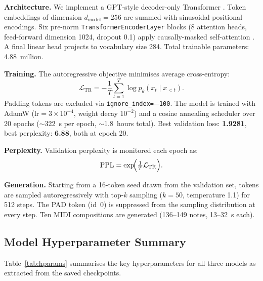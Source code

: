\documentclass[conference]{IEEEtran}
\begin{document}
\textbf{Architecture.} We implement a GPT-style decoder-only Transformer \cite{transformer}. Token embeddings of dimension $d_{\mathrm{model}}{=}256$ are summed with sinusoidal positional encodings. Six pre-norm \texttt{TransformerEncoderLayer} blocks (8 attention heads, feed-forward dimension 1024, dropout 0.1) apply causally-masked self-attention \cite{transformer}. A final linear head projects to vocabulary size 284. Total trainable parameters: 4.88~million.

\textbf{Training.} The autoregressive objective minimises average cross-entropy:
\begin{equation}
\mathcal{L}_{\mathrm{TR}} = -\frac{1}{T}\sum_{t=1}^{T} \log p_\theta(x_t \mid x_{<t}).
\label{eq:ce}
\end{equation}
Padding tokens are excluded via \texttt{ignore\_index=$-$100}. The model is trained with AdamW ($\mathrm{lr}{=}3{\times}10^{-4}$, weight decay $10^{-2}$) and a cosine annealing scheduler over 20 epochs ($\sim$322~s per epoch, $\sim$1.8~hours total). Best validation loss: \textbf{1.9281}, best perplexity: \textbf{6.88}, both at epoch 20.

\textbf{Perplexity.} Validation perplexity is monitored each epoch as:
\begin{equation}
\mathrm{PPL} = \exp\!\Bigl(\tfrac{1}{T}\mathcal{L}_{\mathrm{TR}}\Bigr).
\label{eq:ppl}
\end{equation}

\textbf{Generation.} Starting from a 16-token seed drawn from the validation set, tokens are sampled autoregressively with top-$k$ sampling ($k{=}50$, temperature 1.1) for 512 steps. The PAD token (id~0) is suppressed from the sampling distribution at every step. Ten MIDI compositions are generated (136--149 notes, 13--32~s each).

\subsection{Model Hyperparameter Summary}

Table~\ref{tab:hparams} summarises the key hyperparameters for all three models as extracted from the saved checkpoints.
\end{document}
